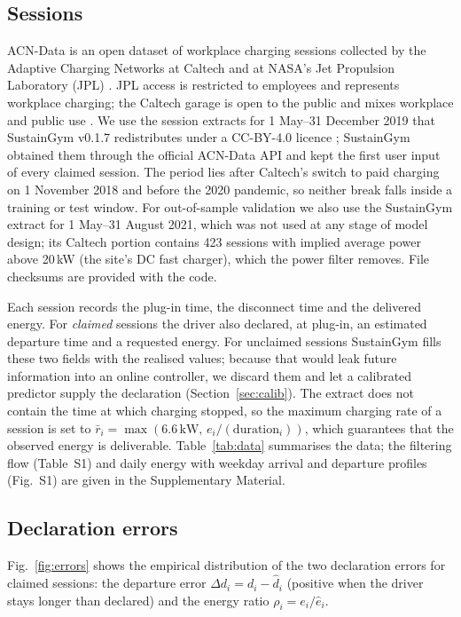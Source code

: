 \subsection{Sessions}
ACN-Data is an open dataset of workplace charging sessions collected by the Adaptive Charging Networks at Caltech and at NASA's Jet Propulsion Laboratory (JPL) \cite{Lee2019ACNData,ACNDataset}. JPL access is restricted to employees and represents workplace charging; the Caltech garage is open to the public and mixes workplace and public use \cite{Lee2019ACNData}. We use the session extracts for 1 May--31 December 2019 that SustainGym v0.1.7 redistributes under a CC-BY-4.0 licence \cite{Yeh2023SustainGym}; SustainGym obtained them through the official ACN-Data API and kept the first user input of every claimed session. The period lies after Caltech's switch to paid charging on 1 November 2018 \cite{Lee2019ACNData} and before the 2020 pandemic, so neither break falls inside a training or test window. For out-of-sample validation we also use the SustainGym extract for 1 May--31 August 2021, which was not used at any stage of model design; its Caltech portion contains 423 sessions with implied average power above 20\,kW (the site's DC fast charger), which the power filter removes. File checksums are provided with the code.

Each session records the plug-in time, the disconnect time and the delivered energy. For \emph{claimed} sessions the driver also declared, at plug-in, an estimated departure time and a requested energy. For unclaimed sessions SustainGym fills these two fields with the realised values; because that would leak future information into an online controller, we discard them and let a calibrated predictor supply the declaration (Section~\ref{sec:calib}). The extract does not contain the time at which charging stopped, so the maximum charging rate of a session is set to $\bar r_i=\max(6.6\,\text{kW},\,e_i/(\text{duration}_i))$, which guarantees that the observed energy is deliverable. Table~\ref{tab:data} summarises the data; the filtering flow (Table~S1) and daily energy with weekday arrival and departure profiles (Fig.~S1) are given in the Supplementary Material.



\subsection{Declaration errors}
Fig.~\ref{fig:errors} shows the empirical distribution of the two declaration errors for claimed sessions: the departure error $\Delta d_i=d_i-\hat d_i$ (positive when the driver stays longer than declared) and the energy ratio $\rho_i=e_i/\hat e_i$. \ErrorSentence

